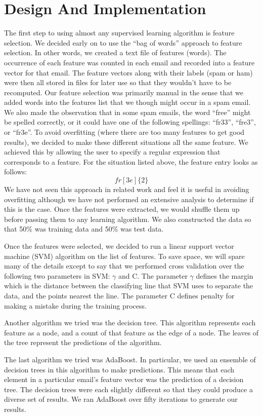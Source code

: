 \section{Design And Implementation}
The first step to using almost any supervised learning algorithm is feature selection. We decided early on to use the ``bag of words'' approach to feature selection. In other words, we created a text file of features (words). The occurrence of each feature was counted in each email and recorded into a feature vector for that email. The feature vectors along with their labels (spam or ham) were then all stored in files for later use so that they wouldn't have to be recomputed. Our feature selection was primarily manual in the sense that we added words into the features list that we though might occur in a spam email. We also made the observation that in some spam emails, the word ``free'' might be spelled correctly, or it could have one of the following spellings: ``fr33'', ``fre3'', or ``fr3e''. To avoid overfitting (where there are too many features to get good results), we decided to make these different situations all the same feature. We achieved this by allowing the user to specify a regular expression that corresponds to a feature. For the situation listed above, the feature entry looks as follows: 
$$fr[3e]\{2\}$$
We have not seen this approach in related work and feel it is useful in avoiding overfitting although we have not performed an extensive analysis to determine if this is the case. Once the features were extracted, we would shuffle them up before passing them to any learning algorithm. We also constructed the data so that 50\% was training data and 50\% was test data.

Once the features were selected, we decided to run a linear support vector machine (SVM) algorithm on the list of features. To save space, we will spare many of the details except to say that we performed cross validation over the following two parameters in SVM: $\gamma$ and C. The parameter $\gamma$ defines the margin which is the distance between the classifying line that SVM uses to separate the data, and the points nearest the line. The parameter C defines penalty for making a mistake during the training process.

Another algorithm we tried was the decision tree. This algorithm represents each feature as a node, and a count of that feature as the edge of a node. The leaves of the tree represent the predictions of the algorithm. 

The last algorithm we tried was AdaBoost. In particular, we used an ensemble of decision trees in this algorithm to make predictions. This means that each element in a particular email's feature vector was the prediction of a decision tree. The decision trees were each slightly different so that they could produce a diverse set of results. We ran AdaBoost over fifty iterations to generate our results.

